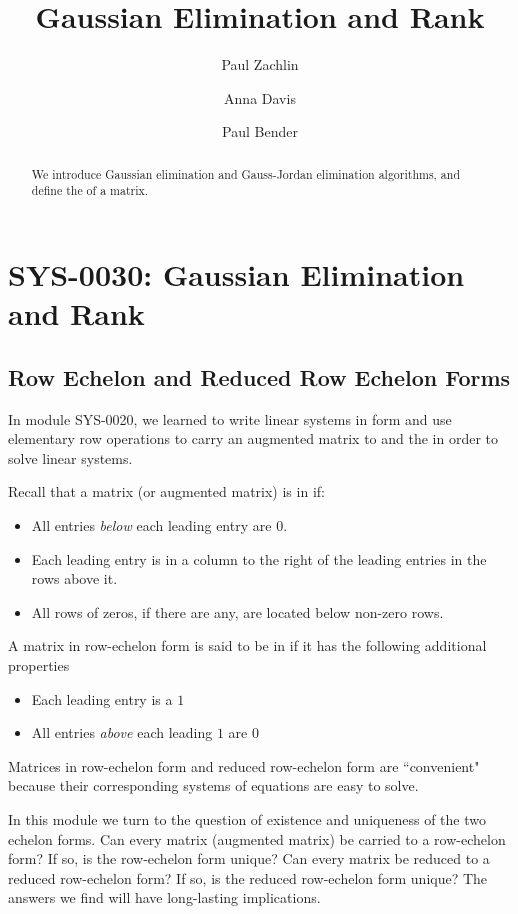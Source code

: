 \documentclass{ximera}
\author{Paul Zachlin \and Anna Davis \and Paul Bender} \title{Gaussian Elimination and Rank} \license{CC-BY 4.0}
\begin{document}
\begin{abstract}
 We introduce Gaussian elimination and Gauss-Jordan elimination algorithms, and define the  of a matrix.
\end{abstract}
\maketitle

\section*{SYS-0030:  Gaussian Elimination and Rank}
\subsection*{Row Echelon and Reduced Row Echelon Forms}

In module SYS-0020, we learned to write linear systems in  form and use elementary row operations to carry an augmented matrix to  and the  in order to solve linear systems.  

Recall that a matrix (or augmented matrix) is in  if:
\begin{itemize}
\item All entries {\it below} each leading entry are $0$.
\item Each leading entry is in a column to the right of the leading entries in the rows above it.
\item All rows of zeros, if there are any, are located below non-zero rows.
\end{itemize}

A matrix in row-echelon form is said to be in  if it has the following additional properties
\begin{itemize}
\item Each leading entry is a $1$
\item All entries {\it above} each leading $1$ are $0$
\end{itemize}


Matrices in row-echelon form and reduced row-echelon form are ``convenient" because their corresponding systems of equations are easy to solve.  

In this module we turn to the question of existence and uniqueness of the two echelon forms.  Can every matrix (augmented matrix) be carried to a row-echelon form?  If so, is the row-echelon form unique?  Can every matrix be reduced to a reduced row-echelon form?  If so, is the reduced row-echelon form unique?  The answers we find will have long-lasting implications.
\end{document}
